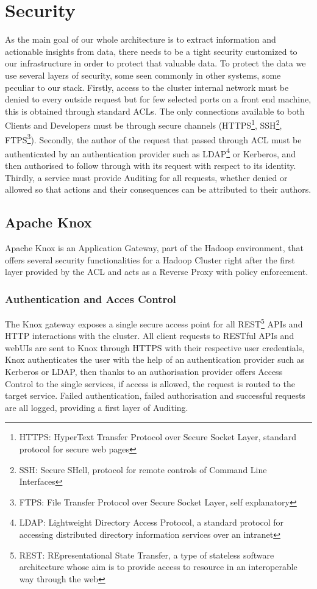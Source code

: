 \chapter{Security}

As the main goal of our whole architecture is to extract information and actionable insights from data, there needs to be a tight security customized to our infrastructure in order to protect that valuable data.
To protect the data we use several layers of security, some seen commonly in other systems, some peculiar to our stack.
\newline
Firstly, access to the cluster internal network must be denied to every outside request but for few selected ports on a front end machine, this is obtained through standard ACLs.
The only connections available to both Clients and Developers must be through secure channels (HTTPS\footnote{HTTPS: HyperText Transfer Protocol over Secure Socket Layer, standard protocol for secure web pages}, SSH\footnote{SSH: Secure SHell, protocol for remote controls of Command Line Interfaces}, FTPS\footnote{FTPS: File Transfer Protocol over Secure Socket Layer, self explanatory}).
\newline
Secondly, the author of the request that passed through ACL must be authenticated by an authentication provider such as LDAP\footnote{LDAP: Lightweight Directory Access Protocol, a standard protocol  for accessing distributed directory information services over an intranet} or Kerberos, and then authorised to follow through with its request with respect to its identity.
\newline
Thirdly, a service must provide Auditing for all requests, whether denied or allowed so that actions and their consequences can be attributed to their authors.

\pagebreak

\section{Apache Knox}

Apache Knox is an Application Gateway, part of the Hadoop environment, that offers several security functionalities for a Hadoop Cluster right after the first layer provided by the ACL and acts as a Reverse Proxy with policy enforcement.
\subsection{Authentication and Acces Control}
The Knox gateway exposes a single secure access point for all REST\footnote{REST: REpresentational State Transfer, a type of stateless software architecture whose aim is to provide access to resource in an interoperable way through the web} APIs and HTTP interactions with the cluster.\newline
All client requests to RESTful APIs and webUIs are sent to Knox through HTTPS with their respective user credentials, Knox authenticates the user with the help of an authentication provider such as Kerberos or LDAP, then thanks to an authorisation provider offers Access Control to the single services, if access is allowed, the request is routed to the target service.
Failed authentication, failed authorisation and successful requests are all logged, providing a first layer of Auditing.
